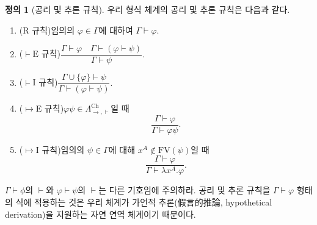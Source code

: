\documentclass[10pt,twocolumn]{article}
\theoremstyle{definition}
\newtheorem{definition}[theorem]{정의}
\newcommand{\Lchh}{\Lambda_{\to,\vdash}^{\text{Ch}}}
\begin{document}
\begin{definition}[공리 및 추론 규칙]
	우리 형식 체계의 공리 및 추론 규칙은 다음과 같다.
	
	\begin{enumerate}
		\item (R 규칙)\quad 임의의 $\varphi\in\Gamma$에 대하여 $\Gamma\vdash\varphi.$
		\item ($\vdash$E 규칙)\quad $\dfrac{\Gamma\vdash\varphi\quad\Gamma\vdash(\varphi\vdash\psi)}{\Gamma\vdash\psi}.$
		\item ($\vdash$I 규칙)\quad $\dfrac{\Gamma\cup\{\varphi\}\vdash\psi}{\Gamma\vdash(\varphi\vdash\psi)}.$
		\item ($\mapsto$E 규칙)\quad $\varphi\psi\in\Lchh$일 때 $$\dfrac{\Gamma\vdash\varphi}{\Gamma\vdash\varphi\psi}.$$
		\item ($\mapsto$I 규칙)\quad 임의의 $\psi\in\Gamma$에 대해 $x^A\notin\mathrm{FV}(\psi)$일 때 $$\dfrac{\Gamma\vdash\varphi}{\Gamma\vdash\lambda x^A.\varphi}.$$
	\end{enumerate}
\end{definition}

$\Gamma\vdash\phi$의 $\vdash$와 $\varphi\vdash\psi$의 $\vdash$는 다른 기호임에 주의하라. 공리 및 추론 규칙을 $\Gamma\vdash\varphi$ 형태의 식에 적용하는 것은 우리 체계가 가언적 추론(假言的推論, hypothetical derivation)을 지원하는 자연 연역 체계이기 때문이다.
\end{document}
